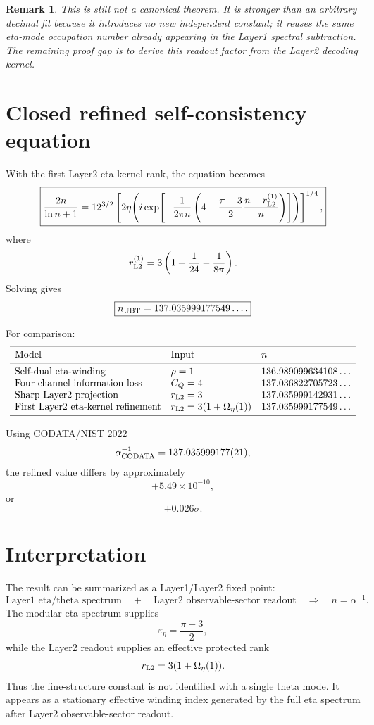 \documentclass[12pt,a4paper]{article}
\newtheorem{remark}[definition]{Remark}
\begin{document}
\begin{remark}
This is still not a canonical theorem.  It is stronger than an arbitrary
decimal fit because it introduces no new independent constant; it reuses the
same eta-mode occupation number already appearing in the Layer1 spectral
subtraction.  The remaining proof gap is to derive this readout factor from
the Layer2 decoding kernel.
\end{remark}

\section{Closed refined self-consistency equation}

With the first Layer2 eta-kernel rank, the equation becomes
\[
  \boxed{
  \frac{2n}{\ln n+1}
  =
  12^{3/2}
  \left[
    2\eta\!\left(
      i\exp\!\left[
        -\frac{1}{2\pi n}
        \left(
          4-\frac{\pi-3}{2}\frac{n-r_{\rm L2}^{(1)}}{n}
        \right)
      \right]
    \right)
  \right]^{1/4},
  }
\]
where
\[
  r_{\rm L2}^{(1)}
  =
  3\left(1+\frac{1}{24}-\frac{1}{8\pi}\right).
\]
Solving gives
\[
  \boxed{
  n_{\rm UBT}=137.035999177549\ldots .
  }
\]

For comparison:
\[
\begin{array}{lll}
\toprule
\text{Model} & \text{Input} & n \\
\midrule
\text{Self-dual eta-winding} & \rho=1 & 136.989099634108\ldots \\
\text{Four-channel information loss} & C_Q=4 & 137.036822705723\ldots \\
\text{Sharp Layer2 projection} & r_{\rm L2}=3 & 137.035999142931\ldots \\
\text{First Layer2 eta-kernel refinement} &
r_{\rm L2}=3(1+\Omega_\eta(1))
& 137.035999177549\ldots \\
\bottomrule
\end{array}
\]

Using CODATA/NIST 2022
\[
  \alpha^{-1}_{\rm CODATA}=137.035999177(21),
\]
the refined value differs by approximately
\[
  +5.49\times10^{-10},
\]
or
\[
  +0.026\sigma.
\]

\section{Interpretation}

The result can be summarized as a Layer1/Layer2 fixed point:
\[
  \text{Layer1 eta/theta spectrum}
  \quad+\quad
  \text{Layer2 observable-sector readout}
  \quad\Rightarrow\quad
  n=\alpha^{-1}.
\]
The modular eta spectrum supplies
\[
  \varepsilon_\eta=\frac{\pi-3}{2},
\]
while the Layer2 readout supplies an effective protected rank
\[
  r_{\rm L2}=3(1+\Omega_\eta(1)).
\]
Thus the fine-structure constant is not identified with a single theta mode.
It appears as a stationary effective winding index generated by the full eta
spectrum after Layer2 observable-sector readout.
\end{document}

